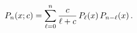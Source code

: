 \[\mathop{P_{n}\/}\nolimits\!\left(x;c\right)=\sum_{\ell=0}^{n}\frac{c}{\ell+c}%
\mathop{P_{\ell}\/}\nolimits\!\left(x\right)\mathop{P_{n-\ell}\/}\nolimits\!%
\left(x\right).\]
